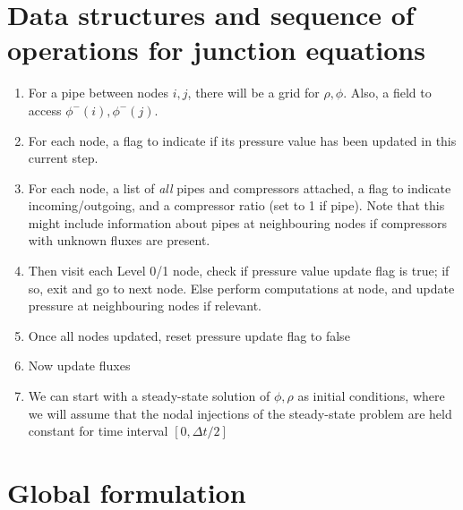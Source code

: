 \documentclass{amsart}
\begin{document}
\section{Data structures and sequence of operations for junction equations}
\begin{enumerate}
\item For a pipe between nodes $i, j$, there will be a grid for $\rho, \phi$. Also, a field to access $\phi^-(i), \phi^-(j)$.
\item For each node, a flag to indicate if its pressure value has been updated in this current step.
\item For each node, a list of \emph{all} pipes and compressors attached, a flag to indicate incoming/outgoing, and a compressor ratio (set to 1 if pipe). Note that this might include information about pipes at neighbouring nodes if compressors with unknown fluxes are present.
\item Then visit each Level 0/1 node, check if pressure value update flag is true; if so, exit and go to next node. Else perform computations at node, and update pressure at neighbouring nodes if relevant.
\item Once all nodes updated, reset pressure update flag to false
\item Now update fluxes
\item We can start with a steady-state solution of $\phi, \rho$ as initial conditions, where we will assume that the nodal injections of the steady-state problem are held constant for time interval $[0, \Delta t/2]$
\end{enumerate}

\section{Global formulation}
\end{document}
